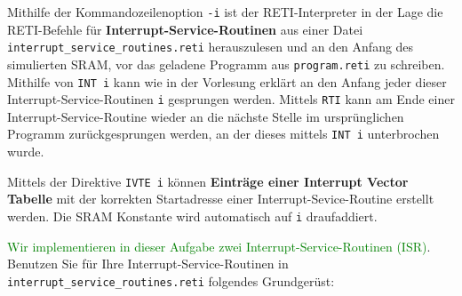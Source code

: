 \documentclass{article}
\begin{document}
{\color{green}
Mithilfe der Kommandozeilenoption \verb|-i| ist der RETI-Interpreter in der Lage die RETI-Befehle für \textbf{Interrupt-Service-Routinen} aus einer Datei \verb|interrupt_service_routines.reti| herauszulesen und an den Anfang des simulierten SRAM, vor das geladene Programm aus \verb|program.reti| zu schreiben. Mithilfe von \verb|INT i| kann wie in der Vorlesung erklärt an den Anfang jeder dieser Interrupt-Service-Routinen \verb|i| gesprungen werden. Mittels \verb|RTI| kann am Ende einer Interrupt-Service-Routine wieder an die nächste Stelle im ursprünglichen Programm zurückgesprungen werden, an der dieses mittels \verb|INT i| unterbrochen wurde. 

Mittels der Direktive \verb|IVTE i| können \textbf{Einträge einer Interrupt Vector Tabelle} mit der korrekten Startadresse einer Interrupt-Sevice-Routine erstellt werden. Die SRAM Konstante wird automatisch auf \verb|i| draufaddiert.
}

\textcolor{green}{Wir implementieren in dieser Aufgabe zwei Interrupt-Service-Routinen (ISR)}.
Benutzen Sie für Ihre Interrupt-Service-Routinen in \texttt{interrupt\_service\_routines.reti} folgendes Grundgerüst:
\end{document}
